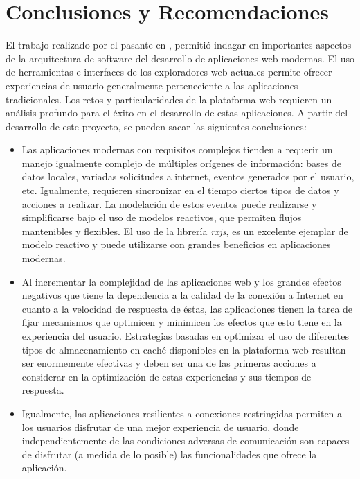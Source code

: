 \chapter{Conclusiones y Recomendaciones}

El trabajo realizado por el pasante en \business, permitió indagar en importantes aspectos de la arquitectura de software del desarrollo de aplicaciones web modernas. El uso de herramientas e interfaces de los exploradores web actuales permite ofrecer experiencias de usuario generalmente perteneciente a las aplicaciones tradicionales. Los retos y particularidades de la plataforma web requieren un análisis profundo para el éxito en el desarrollo de estas aplicaciones. A partir del desarrollo de este proyecto, se pueden sacar las siguientes conclusiones:

\begin{itemize}

  \item Las aplicaciones modernas con requisitos complejos tienden a requerir un manejo igualmente complejo de múltiples orígenes de información: bases de datos locales, variadas solicitudes a internet, eventos generados por el usuario, etc. Igualmente, requieren sincronizar en el tiempo ciertos tipos de datos y acciones a realizar. La modelación de estos eventos puede realizarse y simplificarse bajo el uso de modelos reactivos, que permiten flujos mantenibles y flexibles. El uso de la librería \textit{rxjs}, es un excelente ejemplar de modelo reactivo y puede utilizarse con grandes beneficios en aplicaciones modernas.

  \item Al incrementar la complejidad de las aplicaciones web y los grandes efectos negativos que tiene la dependencia a la calidad de la conexión a Internet en cuanto a la velocidad de respuesta de éstas, las aplicaciones tienen la tarea de fijar mecanismos que optimicen y minimicen los efectos que esto tiene en la experiencia del usuario. Estrategias basadas en optimizar el uso de diferentes tipos de almacenamiento en caché disponibles en la plataforma web resultan ser enormemente efectivas y deben ser una de las primeras acciones a considerar en la optimización de estas experiencias y sus tiempos de respuesta.

  \item Igualmente, las aplicaciones resilientes a conexiones restringidas permiten a los usuarios disfrutar de una mejor experiencia de usuario, donde independientemente de las condiciones adversas de comunicación son capaces de disfrutar (a medida de lo posible) las funcionalidades que ofrece la aplicación.

\end{itemize}

